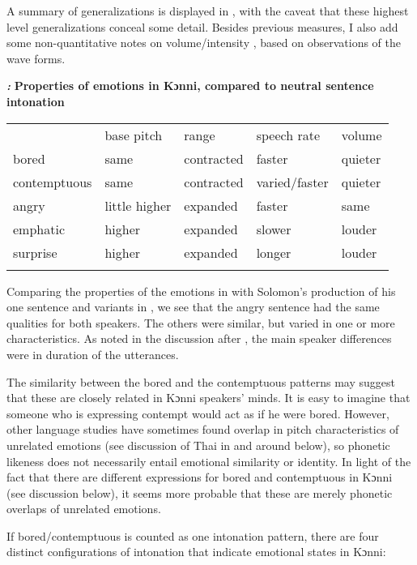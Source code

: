 \documentclass[output=paper]{langsci/langscibook}
\begin{document}
A summary of generalizations is displayed in , with the caveat that these highest level generalizations conceal some detail. Besides previous measures, I also add some non-quantitative notes on volume/intensity , based on observations of the wave forms. 

\emph{\textbf{\textup{:}}}\textbf{ Properties of emotions in Kɔnni, compared to neutral sentence intonation }

\begin{tabular}{lllll} & base pitch & range & speech rate & volume\\
\lsptoprule
bored & same & contracted & faster & quieter\\
contemptuous & same & contracted & varied/faster & quieter\\
angry & little higher & expanded & faster & same\\
emphatic & higher & expanded & slower & louder\\
surprise & higher & expanded & longer & louder\\
\lspbottomrule
\end{tabular}
Comparing the properties of the emotions in  with Solomon’s production of his one sentence and variants in , we see that the angry sentence had the same qualities for both speakers. The others were similar, but varied in one or more characteristics. As noted in the discussion after , the main speaker differences were in duration of the utterances.

The similarity between the bored and the contemptuous patterns may suggest that these are closely related in Kɔnni speakers’ minds. It is easy to imagine that someone who is expressing contempt would act as if he were bored. However, other language studies have sometimes found overlap in pitch characteristics of unrelated emotions (see discussion of Thai in and around  below), so phonetic likeness does not necessarily entail emotional similarity or identity. In light of the fact that there are different expressions for bored and contemptuous in Kɔnni (see discussion below), it seems more probable that these are merely phonetic overlaps of unrelated emotions.

If bored/contemptuous is counted as one intonation pattern, there are four distinct configurations of intonation that indicate emotional states in Kɔnni:
\end{document}
